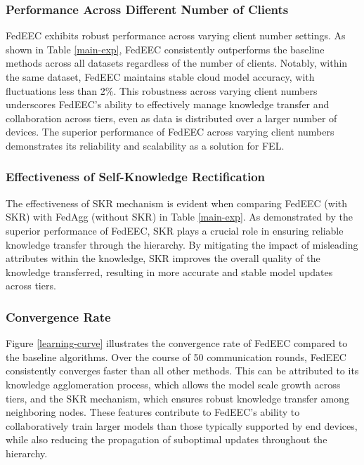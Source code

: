 \documentclass[10pt,journal]{IEEEtran}
\begin{document}


\subsubsection{Performance Across Different Number of Clients}
FedEEC exhibits robust performance across varying client number settings. As shown in Table \ref{main-exp}, FedEEC consistently outperforms the baseline methods across all datasets regardless of the number of clients. Notably, within the same dataset, FedEEC maintains stable cloud model accuracy, with fluctuations less than 2\%. This robustness across varying client numbers underscores FedEEC's ability to effectively manage knowledge transfer and collaboration across tiers, even as data is distributed over a larger number of devices.
The superior performance of FedEEC across varying client numbers demonstrates its reliability and scalability as a solution for FEL.


\subsubsection{Effectiveness of Self-Knowledge Rectification}
The effectiveness of SKR mechanism is evident when comparing FedEEC (with SKR) with FedAgg (without SKR) in Table \ref{main-exp}. As demonstrated by the superior performance of FedEEC, SKR plays a crucial role in ensuring reliable knowledge transfer through the hierarchy. By mitigating the impact of misleading attributes within the knowledge, SKR improves the overall quality of the knowledge transferred, resulting in more accurate and stable model updates across tiers.


\subsubsection{Convergence Rate}
Figure \ref{learning-curve} illustrates the convergence rate of FedEEC compared to the baseline algorithms. Over the course of 50 communication rounds, FedEEC consistently converges faster than all other methods. This can be attributed to its knowledge agglomeration process, which allows the model scale growth across tiers, and the SKR mechanism, which ensures robust knowledge transfer among neighboring nodes. These features contribute to FedEEC's ability to collaboratively train larger models than those typically supported by end devices, while also reducing the propagation of suboptimal updates throughout the hierarchy.
\end{document}
